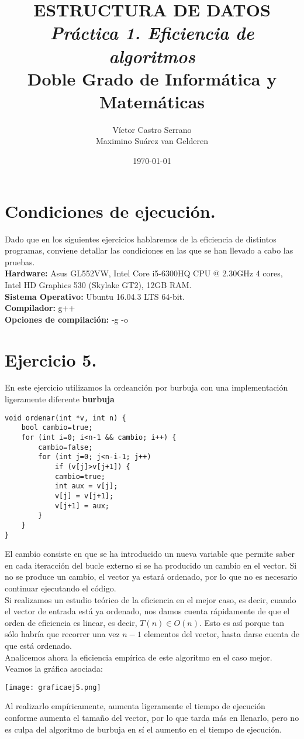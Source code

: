 \documentclass[11pt,a4paper]{article}
\title{\textbf{ESTRUCTURA DE DATOS}\\
	   \textit{Práctica 1. Eficiencia de algoritmos}\\
	   \large \vspace{0.25em} Doble Grado de Informática y Matemáticas}
\author{Víctor Castro Serrano\\ Maximino Suárez van Gelderen}
\date{\today}
\begin{document}
\maketitle

\section*{Condiciones de ejecución.}

Dado que en los siguientes ejercicios hablaremos de la eficiencia de distintos programas, conviene detallar las condiciones en las que se han llevado a cabo las pruebas. \\

\textbf{Hardware:} Asus GL552VW, Intel Core i5-6300HQ CPU @ 2.30GHz 4 cores, Intel HD Graphics 530 (Skylake GT2), 12GB RAM. \\
\textbf{Sistema Operativo:} Ubuntu 16.04.3 LTS 64-bit. \\
\textbf{Compilador:} g++ \\
\textbf{Opciones de compilación:} -g -o

\section*{Ejercicio 5.}

En este ejercicio utilizamos la ordeanción por burbuja con una implementación ligeramente diferente \textbf{burbuja}

\begin{lstlisting}
void ordenar(int *v, int n) {
    bool cambio=true;
    for (int i=0; i<n-1 && cambio; i++) {
        cambio=false;
        for (int j=0; j<n-i-1; j++)
            if (v[j]>v[j+1]) {
            cambio=true;
            int aux = v[j];
            v[j] = v[j+1];
            v[j+1] = aux;
        }
    }
}
\end{lstlisting}

El cambio consiste en que se ha introducido un nueva variable que permite saber en cada iteracción del bucle externo si se ha producido un cambio en el vector. Si no se produce un cambio, el vector ya estará ordenado, por lo que no es necesario continuar ejecutando el código.\\

Si realizamos un estudio teórico de la eficiencia en el mejor caso, es decir, cuando el vector de entrada está ya ordenado, nos damos cuenta rápidamente de que el orden de eficiencia es linear, es decir, $T(n) \in O(n)$. Esto es así porque tan sólo habría que recorrer una vez $n-1$ elementos del vector, hasta darse cuenta de que está ordenado.\\

Analicemos ahora la eficiencia empírica de este algoritmo en el caso mejor. Veamos la gráfica asociada:

\begin{center}
	\texttt{[image: graficaej5.png]}
\end{center}

Al realizarlo empíricamente, aumenta ligeramente el tiempo de ejecución conforme aumenta el tamaño del vector, por lo que tarda más en llenarlo, pero no es culpa del algoritmo de burbuja en sí el aumento en el tiempo de ejecución.
\end{document}
